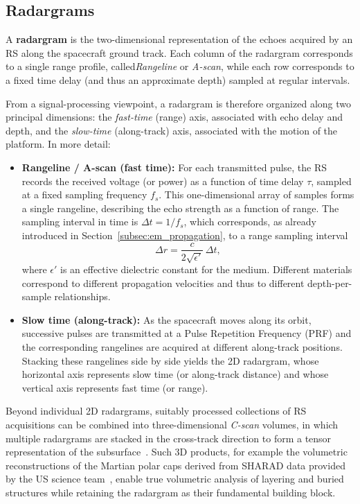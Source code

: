 \subsection{Radargrams}
A \textbf{radargram} is the two-dimensional representation of the echoes acquired by an RS along the spacecraft ground track.
Each column of the radargram corresponds to a single range profile, called\emph{Rangeline} or \emph{A-scan}, while each row corresponds to a fixed time delay (and thus an approximate depth) sampled at regular intervals.

From a signal-processing viewpoint, a radargram is therefore organized along two principal dimensions: the \emph{fast-time} (range) axis, associated with echo delay and depth, and the \emph{slow-time} (along-track) axis, associated with the motion of the platform.
In more detail:
\begin{itemize}
    \item \textbf{Rangeline / A-scan (fast time):} For each transmitted pulse, the RS records the received voltage (or power) as a function of time delay $\tau$, sampled at a fixed sampling frequency $f_s$. This one-dimensional array of samples forms a single rangeline, describing the echo strength as a function of range. The sampling interval in time is $\Delta t = 1/f_s$, which corresponds, as already introduced in Section~\ref{subsec:em_propagation}, to a range sampling interval
    \begin{equation}
        \Delta r = \frac{c}{2\sqrt{\epsilon'}}\,\Delta t,
    \end{equation}
    where $\epsilon'$ is an effective dielectric constant for the medium.
Different materials correspond to different propagation velocities and thus to different depth-per-sample relationships.
    \item \textbf{Slow time (along-track):} As the spacecraft moves along its orbit, successive pulses are transmitted at a Pulse Repetition Frequency (PRF) and the corresponding rangelines are acquired at different along-track positions.
Stacking these rangelines side by side yields the 2D radargram, whose horizontal axis represents slow time (or along-track distance) and whose vertical axis represents fast time (or range).
\end{itemize}

Beyond individual 2D radargrams, suitably processed collections of RS acquisitions can be combined into three-dimensional \emph{C-scan} volumes, in which multiple radargrams are stacked in the cross-track direction to form a tensor representation of the subsurface~\cite{yebasse2025advances}.
Such 3D products, for example the volumetric reconstructions of the Martian polar caps derived from SHARAD data provided by the US science team~\cite{foss2017sharad3d}, enable true volumetric analysis of layering and buried structures while retaining the radargram as their fundamental building block.

